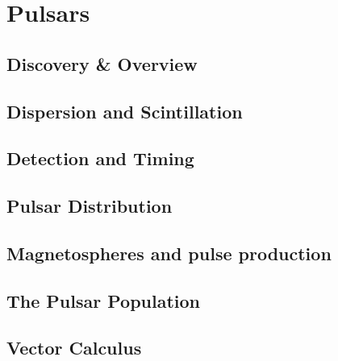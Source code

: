 \documentclass{momento}
\begin{document}


\part{Pulsars}
\label{part:pulsars}

\chapter{Discovery \& Overview}
\label{cha:discovery--overview}


\chapter{Dispersion and Scintillation}
\label{cha:disp-scint}


\chapter{Detection and Timing}
\label{cha:detection-timing}


\chapter{Pulsar Distribution}
\label{cha:pulsar-distribution}


\chapter{Magnetospheres and pulse production}
\label{cha:magn-pulse-prod}


\chapter{The Pulsar Population}
\label{cha:pulsar-population}


\appendices

\chapter{Vector Calculus}
\label{cha:vector-calculus}






\nocite{*}
\end{document}
